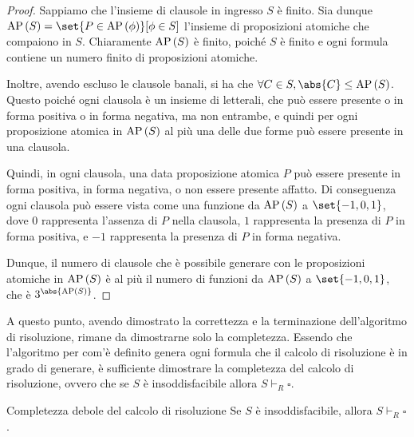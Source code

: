 \begin{proof}
  Sappiamo che l'insieme di clausole in ingresso \(S\) è finito. Sia dunque \(\AP[S] = \set{P \in \AP[\phi]}[\phi \in S]\) l'insieme di proposizioni atomiche che compaiono in \(S\). Chiaramente \(\AP[S]\) è finito, poiché \(S\) è finito e ogni formula contiene un numero finito di proposizioni atomiche.

  Inoltre, avendo escluso le clausole banali, si ha che \(\forall C \in S, \abs{C}\leq\AP[S]\). Questo poiché ogni clausola è un insieme di letterali, che può essere presente o in forma positiva o in forma negativa, ma non entrambe, e quindi per ogni proposizione atomica in \(\AP[S]\) al più una delle due forme può essere presente in una clausola.

  Quindi, in ogni clausola, una data proposizione atomica \(P\) può essere presente in forma positiva, in forma negativa, o non essere presente affatto. Di conseguenza ogni clausola può essere vista come una funzione da \(\AP[S]\) a \(\set{-1,0,1}\), dove \(0\) rappresenta l'assenza di \(P\) nella clausola, \(1\) rappresenta la presenza di \(P\) in forma positiva, e \(-1\) rappresenta la presenza di \(P\) in forma negativa.

  Dunque, il numero di clausole che è possibile generare con le proposizioni atomiche in \(\AP[S]\) è al più il numero di funzioni da \(\AP[S]\) a \(\set{-1,0,1}\), che è \(3^{\abs{\AP[S]}}\).
\end{proof}

A questo punto, avendo dimostrato la correttezza e la terminazione dell'algoritmo di risoluzione, rimane da dimostrarne solo la completezza. Essendo che l'algoritmo per com'è definito genera ogni formula che il calcolo di risoluzione è in grado di generare, è sufficiente dimostrare la completezza del calcolo di risoluzione, ovvero che se \(S\) è insoddisfacibile allora \(S\vdash_R \square\).

\begin{theorem}{Completezza debole del calcolo di risoluzione}
  Se \(S\) è insoddisfacibile, allora \(S\vdash_R \square\).
\end{theorem}

